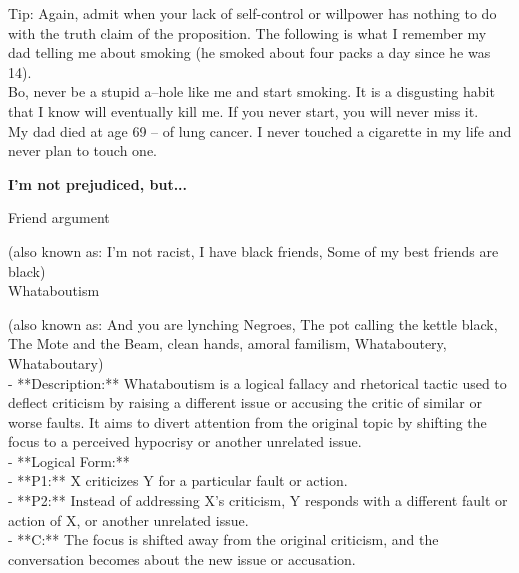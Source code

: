 \documentclass[a4paper,12pt,single,pdftex]{scrartcl}
\begin{document}
{    
      Tip: Again, admit when your lack of self-control or willpower has nothing to do with the truth claim of the proposition.  The following is what I remember my dad telling me about smoking (he smoked about four packs a day since he was 14).
    \\

    
      Bo, never be a stupid a--hole like me and start smoking.  It is a disgusting habit that I know will eventually kill me.  If you never start, you will never miss it.
    \\

    
      My dad died at age 69 -- of lung cancer.  I never touched a cigarette in my life and never plan to touch one.
    \\

  }
\par \textbf{I'm not prejudiced, but...}


Friend argument
    
      (also known as: I'm not racist, I have black friends, Some of my best friends are black)
    \\

  

Whataboutism
    
      (also known as: And you are lynching Negroes, The pot calling the kettle black, The Mote and the Beam, clean hands, amoral familism, Whataboutery, Whataboutary)
    \\

  
    
      - **Description:** Whataboutism is a logical fallacy and rhetorical tactic used to deflect criticism by raising a different issue or accusing the critic of similar or worse faults. It aims to divert attention from the original topic by shifting the focus to a perceived hypocrisy or another unrelated issue.
    \\

    
      - **Logical Form:**
    \\

    
        - **P1:** X criticizes Y for a particular fault or action.
    \\

    
        - **P2:** Instead of addressing X's criticism, Y responds with a different fault or action of X, or another unrelated issue.
    \\

    
        - **C:** The focus is shifted away from the original criticism, and the conversation becomes about the new issue or accusation.
    \\
\end{document}

